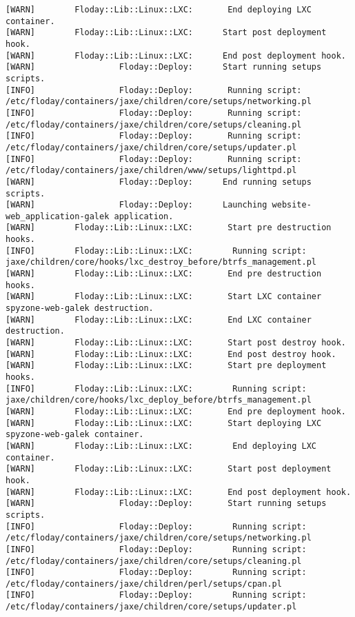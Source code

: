 \begin{lstlisting}[float=t, caption={Sortie d'une exécution de \emph{Floday}}, label=fig_1.4_floday, basicstyle=\tiny, xleftmargin=-3cm]
[WARN]        Floday::Lib::Linux::LXC:       End deploying LXC container.
[WARN]        Floday::Lib::Linux::LXC:      Start post deployment hook.
[WARN]        Floday::Lib::Linux::LXC:      End post deployment hook.
[WARN]                 Floday::Deploy:      Start running setups scripts.
[INFO]                 Floday::Deploy:       Running script: /etc/floday/containers/jaxe/children/core/setups/networking.pl
[INFO]                 Floday::Deploy:       Running script: /etc/floday/containers/jaxe/children/core/setups/cleaning.pl
[INFO]                 Floday::Deploy:       Running script: /etc/floday/containers/jaxe/children/core/setups/updater.pl
[INFO]                 Floday::Deploy:       Running script: /etc/floday/containers/jaxe/children/www/setups/lighttpd.pl
[WARN]                 Floday::Deploy:      End running setups scripts.
[WARN]                 Floday::Deploy:      Launching website-web_application-galek application.
[WARN]        Floday::Lib::Linux::LXC:       Start pre destruction hooks.
[INFO]        Floday::Lib::Linux::LXC:        Running script: jaxe/children/core/hooks/lxc_destroy_before/btrfs_management.pl
[WARN]        Floday::Lib::Linux::LXC:       End pre destruction hooks.
[WARN]        Floday::Lib::Linux::LXC:       Start LXC container spyzone-web-galek destruction.
[WARN]        Floday::Lib::Linux::LXC:       End LXC container destruction.
[WARN]        Floday::Lib::Linux::LXC:       Start post destroy hook.
[WARN]        Floday::Lib::Linux::LXC:       End post destroy hook.
[WARN]        Floday::Lib::Linux::LXC:       Start pre deployment hooks.
[INFO]        Floday::Lib::Linux::LXC:        Running script: jaxe/children/core/hooks/lxc_deploy_before/btrfs_management.pl
[WARN]        Floday::Lib::Linux::LXC:       End pre deployment hook.
[WARN]        Floday::Lib::Linux::LXC:       Start deploying LXC spyzone-web-galek container.
[WARN]        Floday::Lib::Linux::LXC:        End deploying LXC container.
[WARN]        Floday::Lib::Linux::LXC:       Start post deployment hook.
[WARN]        Floday::Lib::Linux::LXC:       End post deployment hook.
[WARN]                 Floday::Deploy:       Start running setups scripts.
[INFO]                 Floday::Deploy:        Running script: /etc/floday/containers/jaxe/children/core/setups/networking.pl
[INFO]                 Floday::Deploy:        Running script: /etc/floday/containers/jaxe/children/core/setups/cleaning.pl
[INFO]                 Floday::Deploy:        Running script: /etc/floday/containers/jaxe/children/perl/setups/cpan.pl
[INFO]                 Floday::Deploy:        Running script: /etc/floday/containers/jaxe/children/core/setups/updater.pl

\end{lstlisting}
